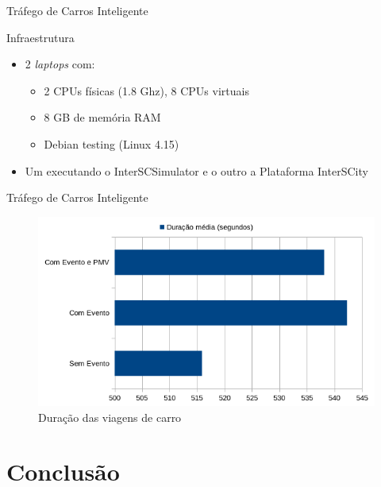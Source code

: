 \documentclass[xcolor={usenames,svgnames,dvipsnames},brazil,english,12pt,aspectratio=149]{beamer}
\begin{document}
\begin{frame}{Tráfego de Carros Inteligente}
    \begin{block}{Infraestrutura}
        \begin{itemize}
            \item 2 \textit{laptops} com:
                \begin{itemize}
                    \item 2 CPUs físicas (1.8 Ghz), 8 CPUs virtuais
                    \item 8 GB de memória RAM
                    \item Debian testing (Linux 4.15)
                \end{itemize}
            \item Um executando o InterSCSimulator e o outro a Plataforma InterSCity
        \end{itemize}
    \end{block}
\end{frame}

\begin{frame}{Tráfego de Carros Inteligente}
     \begin{figure}[ht]
        \centering
        \includegraphics[width=.7\textwidth]{duracao_filtered.png}
        \caption{Duração das viagens de carro}
    \end{figure}
\end{frame}

\section{Conclusão}
\end{document}
